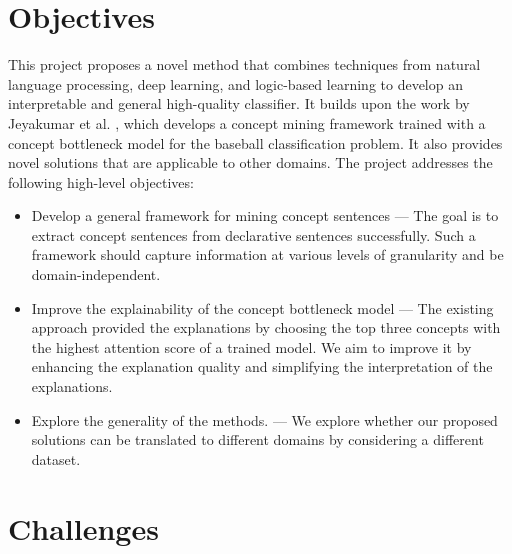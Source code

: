 \section{Objectives}

This project proposes a novel method that combines techniques from natural language processing, deep learning, and logic-based learning to develop an interpretable and general high-quality classifier.
It builds upon the work by Jeyakumar et al. \cite{RefWorks:RefID:16-2021automatic}, which develops a concept mining framework trained with a concept bottleneck model for the baseball classification problem. 
It also provides novel solutions that are applicable to other domains.
The project addresses the following high-level objectives:


\begin{itemize}
    \item Develop a general framework for mining concept sentences --- The goal is to extract concept sentences from declarative sentences successfully. Such a framework should capture information at various levels of granularity and be domain-independent.
    
    \item Improve the explainability of the concept bottleneck model ---  The existing approach provided the explanations by choosing the top three concepts with the highest attention score of a trained model.
    We aim to improve it by enhancing the explanation quality and simplifying the interpretation of the explanations.
    
    \item Explore the generality of the methods. --- We explore whether our proposed solutions can be translated to different domains by considering a different dataset.
    
\end{itemize}

\section{Challenges}

